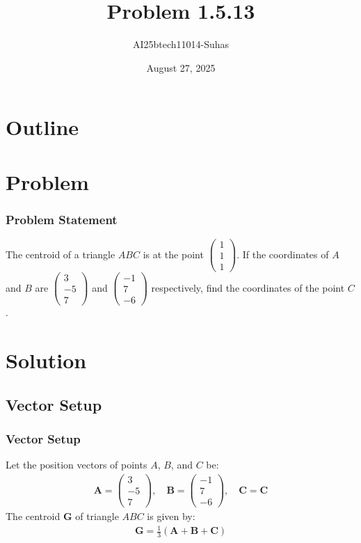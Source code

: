 \documentclass{beamer}
\title{Problem 1.5.13}
\author{AI25btech11014-Suhas}
\date{August 27, 2025}
\providecommand{\myvec}[1]{\ensuremath{\begin{pmatrix}#1\end{pmatrix}}}
\let\vec\mathbf
\begin{document}
\begin{frame}
\titlepage
\end{frame}

\section*{Outline}
\begin{frame}
\tableofcontents
\end{frame}

\section{Problem}

\begin{frame}
\frametitle{Problem Statement}
The centroid of a triangle $ABC$ is at the point $\myvec{1\\1\\1}$. If the coordinates of $A$ and $B$ are $\myvec{3\\-5\\7}$ and $\myvec{-1\\7\\-6}$ respectively, find the coordinates of the point $C$.
\end{frame}

\section{Solution}

\subsection{Vector Setup}
\begin{frame}
\frametitle{Vector Setup}
Let the position vectors of points $A$, $B$, and $C$ be:
\begin{align}
\vec{A} = \myvec{3\\-5\\7},\quad
\vec{B} = \myvec{-1\\7\\-6},\quad
\vec{C} = \vec{C}
\end{align}
The centroid $\vec{G}$ of triangle $ABC$ is given by:
\begin{align}
\vec{G} = \frac{1}{3}(\vec{A} + \vec{B} + \vec{C})
\end{align}
\end{frame}
\end{document}
